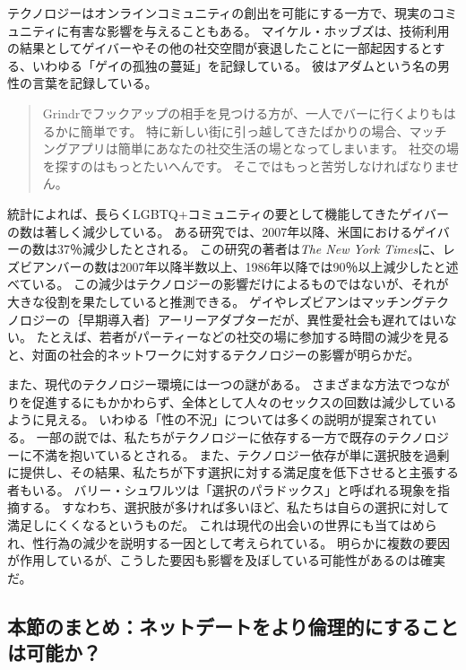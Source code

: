 \documentclass[paper=a4,book,openany]{jlreq}
\begin{document}
テクノロジーはオンラインコミュニティの創出を可能にする一方で、現実のコミュニティに有害な影響を与えることもある。
マイケル・ホッブズは、技術利用の結果としてゲイバーやその他の社交空間が衰退したことに一部起因するとする、いわゆる「ゲイの孤独の蔓延」を記録している。
彼はアダムという名の男性の言葉を記録している。
\begin{quote}
  Grindrでフックアップの相手を見つける方が、一人でバーに行くよりもはるかに簡単です。
特に新しい街に引っ越してきたばかりの場合、マッチングアプリは簡単にあなたの社交生活の場となってしまいます。
社交の場を探すのはもっとたいへんです。
そこではもっと苦労しなければなりません。
\citep{hobbes17:_toget_alone}
\end{quote}

統計によれば、長らくLGBTQ+コミュニティの要として機能してきたゲイバーの数は著しく減少している。
ある研究では、2007年以降、米国におけるゲイバーの数は37％減少したとされる\citep{mattson19:_are_gay_bars_closin}。
この研究の著者は\emph{The New York Times}に、レズビアンバーの数は2007年以降半数以上、1986年以降では90％以上減少したと述べている\citep{wilson20:_where_did_all_lesbian_bars_go}。
この減少はテクノロジーの影響だけによるものではないが、それが大きな役割を果たしていると推測できる。
ゲイやレズビアンはマッチングテクノロジーの｛早期導入者｝{アーリーアダプター}だが、異性愛社会も遅れてはいない。
たとえば、若者がパーティーなどの社交の場に参加する時間の減少を見ると、対面の社会的ネットワークに対するテクノロジーの影響が明らかだ\citep{wayne15:_death_party}。

また、現代のテクノロジー環境には一つの謎がある。
さまざまな方法でつながりを促進するにもかかわらず、全体として人々のセックスの回数は減少しているように見える。
いわゆる「性の不況」については多くの説明が提案されている\citep{julian18:_why_are_young_peopl_havin}。
一部の説では、私たちがテクノロジーに依存する一方で既存のテクノロジーに不満を抱いているとされる。
また、テクノロジー依存が単に選択肢を過剰に提供し、その結果、私たちが下す選択に対する満足度を低下させると主張する者もいる。
バリー・シュワルツは「選択のパラドックス」と呼ばれる現象を指摘する。
すなわち、選択肢が多ければ多いほど、私たちは自らの選択に対して満足しにくくなるというものだ。
これは現代の出会いの世界にも当てはめられ、性行為の減少を説明する一因として考えられている\citep{svoboda16:_probl_moder_roman_is_too_much_choic}。
明らかに複数の要因が作用しているが、こうした要因も影響を及ぼしている可能性があるのは確実だ。

\subsection{本節のまとめ：ネットデートをより倫理的にすることは可能か？}
\end{document}
